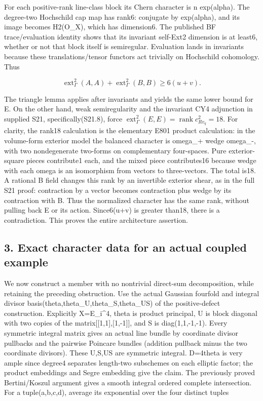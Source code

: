 For each positive-rank line-class block its Chern character is n exp(alpha).
The degree-two Hochschild cap map has rank6: conjugate by exp(alpha), and
its image becomes H2(O\_X), which has dimension6. The published BF
trace/evaluation identity shows that its invariant self-Ext2 dimension is at
least6, whether or not that block itself is semiregular. Evaluation lands in
invariants because these translations/tensor functors act trivially on
Hochschild cohomology. Thus

\[
 \operatorname{ext}^2_\Gamma(A,A)+\operatorname{ext}^2_\Gamma(B,B)
       \ge6(u+v).
 \tag{E826.6}
\]

The triangle lemma applies after invariants and yields the same lower bound
for E. On the other hand, weak semiregularity and the invariant CY4
adjunction in supplied S21, specifically(S21.8), force
\(\operatorname{ext}^2_\Gamma(E,E)=\operatorname{rank}c^2_{Rv_q}=18\). For
clarity, the rank18 calculation is the elementary E801 product calculation:
in the volume-form exterior model the balanced character is omega\_+ wedge
omega\_-, with two nondegenerate two-forms on complementary four-spaces.
Pure exterior-square pieces contribute1 each, and the mixed piece
contributes16 because wedge with each omega is an isomorphism from vectors
to three-vectors. The total is18. A rational B field changes this rank by an
invertible exterior shear, as in the full S21 proof: contraction by a vector
becomes contraction plus wedge by its contraction with B. Thus the
normalized character has the same rank, without pulling back E or its
action. Since6(u+v) is greater than18, there is a contradiction. This proves
the entire architecture assertion.

\subsection{3. Exact character data for an actual coupled
example}\label{SF-E826:exact-character-data-for-an-actual-coupled-example}

We now construct a member with no nontrivial direct-sum decomposition, while
retaining the preceding obstruction. Use the actual Gaussian fourfold and
integral divisor basis(theta,theta\_U,theta\_S,theta\_US) of the
positive-defect construction. Explicitly X=E\_i\^{}4, theta is product
principal, U is block diagonal with two copies of the
matrix{[}{[}1,1{]},{[}1,-1{]}{]}, and S is diag(1,1,-1,-1). Every symmetric
integral matrix gives an actual line bundle by coordinate divisor pullbacks
and the pairwise Poincare bundles (addition pullback minus the two
coordinate divisors). These U,S,US are symmetric integral. D=4theta is very
ample since degree4 separates length-two subschemes on each elliptic factor;
the product embeddings and Segre embedding give the claim. The previously
proved Bertini/Koszul argument gives a smooth integral ordered complete
intersection. For a tuple(a,b,c,d), average its exponential over the four
distinct tuples

